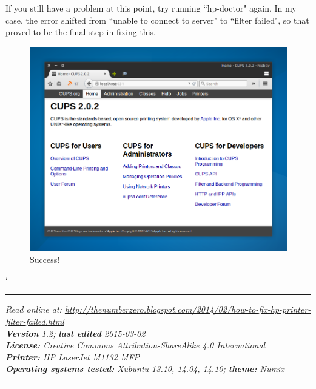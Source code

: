 \documentclass[12pt, a4paper]{article}
\begin{document}
\noindent If you still have a problem at this point, try running ``hp-doctor" again. In my case, the error shifted from ``unable to connect to server" to ``filter failed", so that proved to be the final step in fixing this.

\begin{figure}[!htp]
  \centering
  \includegraphics[width=1\textwidth]{imgs/unable-to-connect-to-server-6.png}
  \caption{Success!}
  \label{fig16}
\end{figure}
















`


\newpage
\vspace{4cm}
\hrule
\noindent \center \emph{Read online at: \url{http://thenumberzero.blogspot.com/2014/02/how-to-fix-hp-printer-filter-failed.html}\\
\textbf{Version} 1.2; \textbf{last edited} 2015-03-02\\
\textbf{License:} Creative Commons Attribution-ShareAlike 4.0 International\\
\textbf{Printer:} HP LaserJet M1132 MFP\\
\textbf{Operating systems tested:} Xubuntu 13.10, 14.04, 14.10; \textbf{theme:} Numix}
\vspace{1em}
\hrule
\end{document}
